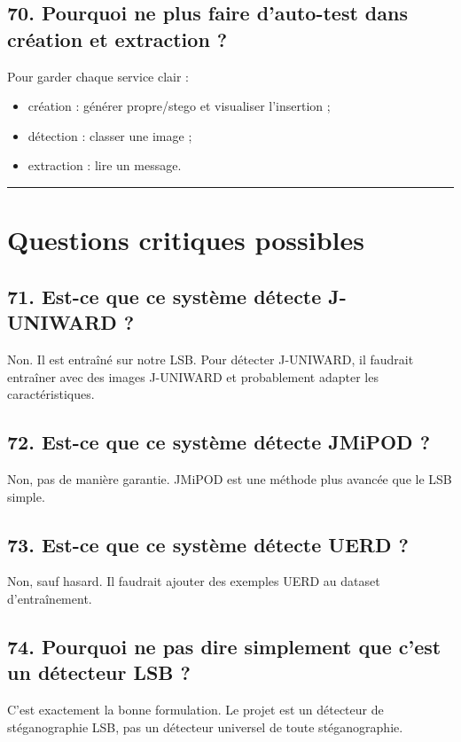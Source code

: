 \documentclass[11pt,a4paper]{article}
\begin{document}
\subsection{70. Pourquoi ne plus faire d'auto-test dans création et extraction ?}

Pour garder chaque service clair :

\begin{itemize}
\item création : générer propre/stego et visualiser l'insertion ;
\item détection : classer une image ;
\item extraction : lire un message.
\end{itemize}

\hrule

\section{Questions critiques possibles}

\subsection{71. Est-ce que ce système détecte J-UNIWARD ?}

Non. Il est entraîné sur notre LSB. Pour détecter J-UNIWARD, il faudrait entraîner avec des images J-UNIWARD et probablement adapter les caractéristiques.

\subsection{72. Est-ce que ce système détecte JMiPOD ?}

Non, pas de manière garantie. JMiPOD est une méthode plus avancée que le LSB simple.

\subsection{73. Est-ce que ce système détecte UERD ?}

Non, sauf hasard. Il faudrait ajouter des exemples UERD au dataset d'entraînement.

\subsection{74. Pourquoi ne pas dire simplement que c'est un détecteur LSB ?}

C'est exactement la bonne formulation. Le projet est un détecteur de stéganographie LSB, pas un détecteur universel de toute stéganographie.
\end{document}
